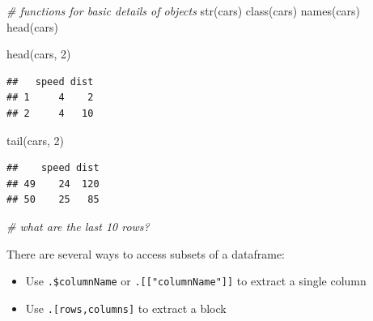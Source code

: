 \documentclass[
  11pt,
  a4paper,
]{book}
\newenvironment{Shaded}{\begin{snugshade}}{\end{snugshade}}
\newcommand{\CommentTok}[1]{\textcolor[rgb]{0.56,0.35,0.01}{\textit{#1}}}
\newcommand{\DecValTok}[1]{\textcolor[rgb]{0.00,0.00,0.81}{#1}}
\newcommand{\FunctionTok}[1]{\textcolor[rgb]{0.00,0.00,0.00}{#1}}
\newcommand{\NormalTok}[1]{#1}
\newcommand{\SpecialCharTok}[1]{\textcolor[rgb]{0.00,0.00,0.00}{#1}}
\newcommand{\StringTok}[1]{\textcolor[rgb]{0.31,0.60,0.02}{#1}}
\providecommand{\tightlist}{%
  \setlength{\itemsep}{0pt}\setlength{\parskip}{0pt}}
\begin{document}
\begin{Shaded}
\begin{Highlighting}[]
\CommentTok{\# functions for basic details of objects}
\FunctionTok{str}\NormalTok{(cars)}
\FunctionTok{class}\NormalTok{(cars)}
\FunctionTok{names}\NormalTok{(cars)}
\FunctionTok{head}\NormalTok{(cars)}
\end{Highlighting}
\end{Shaded}

\begin{Shaded}
\begin{Highlighting}[]
\FunctionTok{head}\NormalTok{(cars, }\DecValTok{2}\NormalTok{)}
\end{Highlighting}
\end{Shaded}

\begin{verbatim}
##   speed dist
## 1     4    2
## 2     4   10
\end{verbatim}

\begin{Shaded}
\begin{Highlighting}[]
\FunctionTok{tail}\NormalTok{(cars, }\DecValTok{2}\NormalTok{)}
\end{Highlighting}
\end{Shaded}

\begin{verbatim}
##    speed dist
## 49    24  120
## 50    25   85
\end{verbatim}

\begin{Shaded}
\begin{Highlighting}[]
\CommentTok{\# what are the last 10 rows?}
\end{Highlighting}
\end{Shaded}

There are several ways to access subsets of a dataframe:

\begin{itemize}
\tightlist
\item
  Use \texttt{.\$columnName} or \texttt{.{[}{[}"columnName"{]}{]}} to extract a single column
\item
  Use \texttt{.{[}rows,columns{]}} to extract a block
\end{itemize}

\begin{Shaded}
\end{Shaded}
\end{document}
